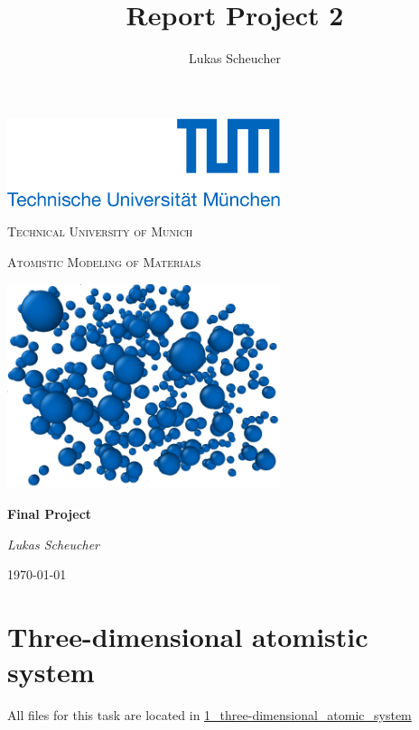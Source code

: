 \documentclass[10pt,a4paper]{report}
\title{Report Project 2}
\author{Lukas Scheucher}
\def \pathpartone {../../1_three-dimensional_atomic_system}
\begin{document}
\begin{titlepage}
	\centering
	\includegraphics[width=0.6\textwidth]{tum_logo.png}\par\vspace{1cm}
	{\scshape\LARGE Technical University of Munich \par}
	\vspace{1cm}
	{\scshape\Large Atomistic Modeling of Materials\par}
	\vspace{1.5cm}
	\includegraphics[width=0.6\textwidth]{titlepicture2.png}\par\vspace{1cm}
	{\huge\bfseries Final Project\par}
	\vspace{2cm}
	{\Large\itshape Lukas Scheucher\par}
	\vfill

	{\large \today\par}
\end{titlepage}






\tableofcontents
\listoffigures

\chapter{Three-dimensional atomistic system}
All files for this task are located in \href{\pathpartone}{1\_three-dimensional\_atomic\_system}\\
\end{document}
